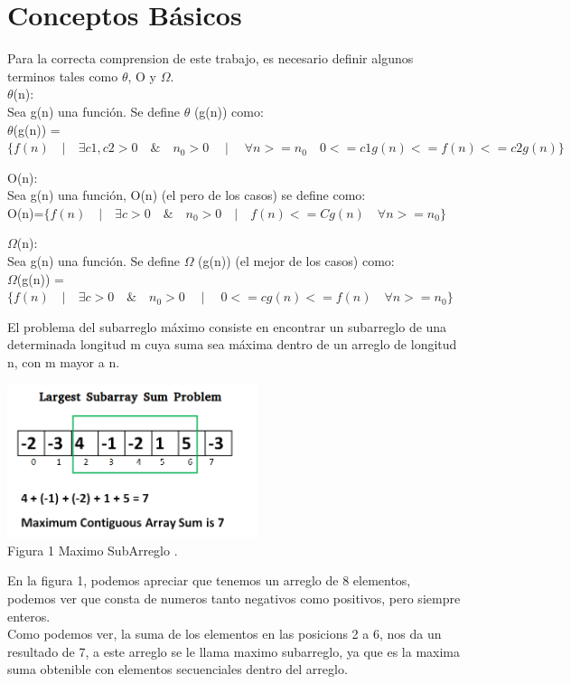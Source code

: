 \documentclass[spanish]{article}
\begin{document}
\newpage
	\section{Conceptos B\'asicos}
	Para la correcta comprension de este trabajo, es necesario definir algunos terminos tales como $\theta$, O y $\Omega$.\\
	 $\theta$(n):\\
		Sea g(n) una función. Se define  $\theta$ (g(n)) como:\\
		
		 	$\theta$(g(n)) = $\{ f(n) \quad | \quad \exists c1,c2>0 \quad \& \quad n_{0}>0 \quad \mid \quad \forall n>=n_{0} \quad 0<= c1g(n) <= f(n) <= c2g(n) \}$
	\bigskip		 	
		 	
	O(n):\\
		Sea  g(n)  una función, O(n) (el pero de los casos) se define como:\\
		
			\hspace{1cm}O(n)=$\{f(n) \quad | \quad \exists c >0 \quad \& \quad n_{0}>0 \quad | \quad f(n) <= Cg(n) \quad \forall  n>= n_{0} \}$
	\bigskip
	
	$\Omega$(n):\\
	Sea  g(n)  una función. Se define $\Omega$ (g(n)) (el mejor de los casos) como:\\

		\hspace{1cm}$\Omega$(g(n)) =$\{f(n) \quad | \quad \exists c >0 \quad \& \quad n_{0}>0 \quad \mid \quad  0<= cg(n)<= f(n) \quad \forall n>= n_{0} \}$
	\bigskip

	El problema del subarreglo máximo consiste en encontrar un subarreglo de una determinada longitud m cuya suma sea máxima dentro de un arreglo de longitud n, con m mayor a n.\\
	\begin{center}
		\includegraphics[width=0.55\textwidth]{./imagenes/fig1.png}\\
		Figura 1 Maximo SubArreglo .\\
	\end{center}
	En la figura 1, podemos apreciar que tenemos un arreglo de 8 elementos, podemos ver que consta de numeros tanto negativos como positivos, pero siempre enteros.\\
Como podemos ver, la suma de los elementos en las posicions 2 a 6, nos da un resultado de 7, a este arreglo se le llama maximo subarreglo, ya que es la maxima suma obtenible con elementos secuenciales dentro del arreglo.
	
\end{document}
